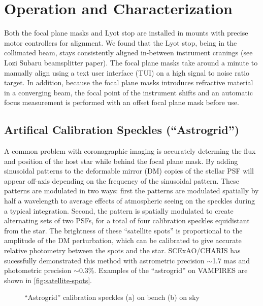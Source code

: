 \documentclass[]{spie}  %
\begin{document}
\section{Operation and Characterization}\label{sec:tests}

Both the focal plane masks and Lyot stop are installed in mounts with precise motor controllers for alignment. We found that the Lyot stop, being in the collimated beam, stays consistently aligned in-between instrument cranings (see Lozi Subaru beamsplitter paper). The focal plane masks take around a minute to manually align using a text user interface (TUI) on a high signal to noise ratio target. In addition, because the focal plane masks introduces refractive material in a converging beam, the focal point of the instrument shifts and an automatic focus measurement is performed with an offset focal plane mask before use.

\subsection{Artifical Calibration Speckles (``Astrogrid'')}

A common problem with coronagraphic imaging is accurately determing the flux and position of the host star while behind the focal plane mask. By adding sinusoidal patterns to the deformable mirror (DM) copies of the stellar PSF will appear off-axis depending on the frequency of the sinusoidal pattern\cite{sahoo2020}. These patterns are modulated in two ways: first the patterns are modulated spatially by half a wavelength to average effects of atmospheric seeing on the speckles during a typical integration. Second, the pattern is spatially modulated to create alternating sets of two PSFs, for a total of four calibration speckles equidistant from the star. The brightness of these ``satellite spots'' is proportional to the amplitude of the DM perturbation, which can be calibrated to give accurate relative photometry between the spots and the star. SCExAO/CHARIS has sucessfully demonstrated this method with astrometric precision $\sim$1.7 mas and photometric precision $\sim$0.3\%\cite{currie2020}. Examples of the ``astrogrid'' on VAMPIRES are shown in \autoref{fig:satellite-spots}.

\begin{figure}
   \centering
   \hspace{0.1in}
   \caption{``Astrogrid'' calibration speckles (a) on bench (b) on sky}\label{fig:satellite-spots}
\end{figure}
\end{document}
